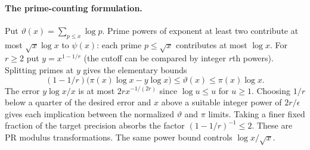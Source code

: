 \paragraph{The prime-counting formulation.}
Put $\vartheta(x)=\sum_{p\le x}\log p$. Prime powers of exponent
at least two contribute at most $\sqrt x\log x$ to $\psi(x)$:
each prime $p\le\sqrt x$ contributes at most $\log x$.
For $r\ge2$ put $y=x^{1-1/r}$ (the cutoff can be compared by integer
$r$th powers). Splitting primes at $y$ gives the elementary bounds
\[
 (1-1/r)\big(\pi(x)\log x-y\log x\big)
       \le\vartheta(x)\le \pi(x)\log x .
\]
The error $y\log x/x$ is at most $2r x^{-1/(2r)}$ since
$\log u\le u$ for $u\ge1$. Choosing $1/r$ below a quarter of the desired
error and $x$ above a suitable integer power of $2r/\epsilon$
gives each implication between the normalized $\vartheta$ and
$\pi$ limits. Taking a finer fixed fraction of the target precision
absorbs the factor $(1-1/r)^{-1}\le2$. These are PR modulus
transformations. The same power bound controls $\log x/\sqrt x$.
